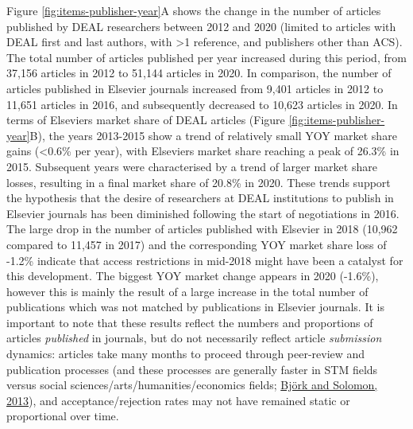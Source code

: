 \documentclass[
]{article}
\begin{document}
Figure \ref{fig:items-publisher-year}A shows the change in the number of articles published by DEAL researchers between 2012 and 2020 (limited to articles with DEAL first and last authors, with \textgreater1 reference, and publishers other than ACS). The total number of articles published per year increased during this period, from 37,156 articles in 2012 to 51,144 articles in 2020. In comparison, the number of
articles published in Elsevier journals increased from 9,401 articles in 2012 to 11,651 articles in 2016, and subsequently decreased to 10,623 articles in 2020. In terms of Elsevier\textquotesingle s market share of DEAL articles (Figure \ref{fig:items-publisher-year}B), the years 2013-2015 show a trend of relatively small YOY market share gains (\textless0.6\% per year), with Elsevier\textquotesingle s market share reaching a peak of 26.3\% in 2015. Subsequent years were characterised by a trend of larger market share losses, resulting in a final market share of 20.8\% in 2020. These trends support the hypothesis that the desire of researchers at DEAL institutions to publish in Elsevier journals has been diminished following the start of negotiations in 2016. The large drop in the number of articles published with Elsevier in 2018 (10,962 compared to 11,457 in 2017) and the corresponding YOY market share loss of -1.2\% indicate that access restrictions in mid-2018 might have been a catalyst for this development. The biggest YOY market change appears in 2020 (-1.6\%), however this is mainly the result of a large increase in the total number of publications which was not matched by publications in Elsevier journals. It is important to note that these results reflect the numbers and proportions of articles \emph{published} in journals, but do not necessarily reflect article \emph{submission} dynamics: articles take many months to proceed through peer-review and publication processes (and these processes are generally faster in STM fields versus social sciences/arts/humanities/economics fields; \href{https://doi.org/10.1016/j.joi.2013.09.001}{Björk and Solomon, 2013}), and acceptance/rejection rates may not have remained static or proportional over time.
\end{document}
